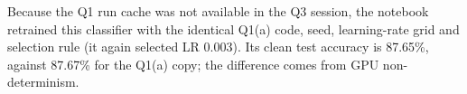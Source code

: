 Because the Q1 run cache was not available in the Q3 session, the notebook retrained this classifier with the identical Q1(a) code, seed, learning-rate grid and selection rule (it again selected LR 0.003). Its clean test accuracy is 87.65\%, against 87.67\% for the Q1(a) copy; the difference comes from GPU non-determinism.
